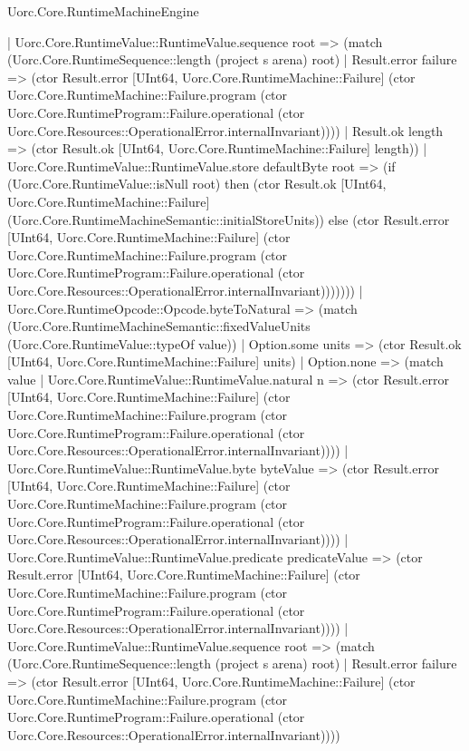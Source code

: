 \begin{lexlean}{Uorc.Core.RuntimeMachineEngine}
\begin{semanticmodule}
{              | Uorc.Core.RuntimeValue::RuntimeValue.sequence root => (match (Uorc.Core.RuntimeSequence::length (project s arena) root)
                | Result.error failure => (ctor Result.error [UInt64, Uorc.Core.RuntimeMachine::Failure] (ctor Uorc.Core.RuntimeMachine::Failure.program (ctor Uorc.Core.RuntimeProgram::Failure.operational (ctor Uorc.Core.Resources::OperationalError.internalInvariant))))
                | Result.ok length => (ctor Result.ok [UInt64, Uorc.Core.RuntimeMachine::Failure] length))
              | Uorc.Core.RuntimeValue::RuntimeValue.store defaultByte root => (if (Uorc.Core.RuntimeValue::isNull root) then (ctor Result.ok [UInt64, Uorc.Core.RuntimeMachine::Failure] (Uorc.Core.RuntimeMachineSemantic::initialStoreUnits)) else (ctor Result.error [UInt64, Uorc.Core.RuntimeMachine::Failure] (ctor Uorc.Core.RuntimeMachine::Failure.program (ctor Uorc.Core.RuntimeProgram::Failure.operational (ctor Uorc.Core.Resources::OperationalError.internalInvariant)))))))
          | Uorc.Core.RuntimeOpcode::Opcode.byteToNatural => (match (Uorc.Core.RuntimeMachineSemantic::fixedValueUnits (Uorc.Core.RuntimeValue::typeOf value))
            | Option.some units => (ctor Result.ok [UInt64, Uorc.Core.RuntimeMachine::Failure] units)
            | Option.none => (match value
              | Uorc.Core.RuntimeValue::RuntimeValue.natural n => (ctor Result.error [UInt64, Uorc.Core.RuntimeMachine::Failure] (ctor Uorc.Core.RuntimeMachine::Failure.program (ctor Uorc.Core.RuntimeProgram::Failure.operational (ctor Uorc.Core.Resources::OperationalError.internalInvariant))))
              | Uorc.Core.RuntimeValue::RuntimeValue.byte byteValue => (ctor Result.error [UInt64, Uorc.Core.RuntimeMachine::Failure] (ctor Uorc.Core.RuntimeMachine::Failure.program (ctor Uorc.Core.RuntimeProgram::Failure.operational (ctor Uorc.Core.Resources::OperationalError.internalInvariant))))
              | Uorc.Core.RuntimeValue::RuntimeValue.predicate predicateValue => (ctor Result.error [UInt64, Uorc.Core.RuntimeMachine::Failure] (ctor Uorc.Core.RuntimeMachine::Failure.program (ctor Uorc.Core.RuntimeProgram::Failure.operational (ctor Uorc.Core.Resources::OperationalError.internalInvariant))))
              | Uorc.Core.RuntimeValue::RuntimeValue.sequence root => (match (Uorc.Core.RuntimeSequence::length (project s arena) root)
                | Result.error failure => (ctor Result.error [UInt64, Uorc.Core.RuntimeMachine::Failure] (ctor Uorc.Core.RuntimeMachine::Failure.program (ctor Uorc.Core.RuntimeProgram::Failure.operational (ctor Uorc.Core.Resources::OperationalError.internalInvariant))))
}
\end{semanticmodule}
\end{lexlean}
